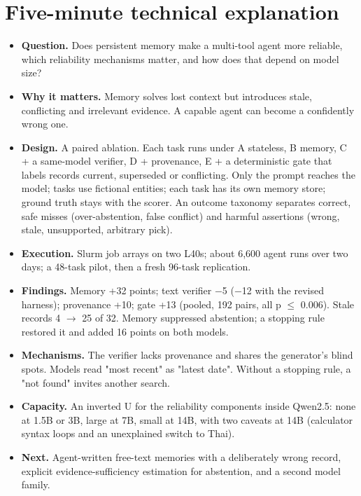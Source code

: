 \documentclass[10.5pt,a4paper,oneside]{report}
\begin{document}
\section{Five-minute technical explanation}
\begin{itemize}
\item \textbf{Question.} Does persistent memory make a multi-tool agent more reliable, which reliability mechanisms matter, and how does that depend on model size?
\item \textbf{Why it matters.} Memory solves lost context but introduces stale, conflicting and irrelevant evidence. A capable agent can become a confidently wrong one.
\item \textbf{Design.} A paired ablation. Each task runs under A stateless, B memory, C + a same-model verifier, D + provenance, E + a deterministic gate that labels records current, superseded or conflicting. Only the prompt reaches the model; tasks use fictional entities; each task has its own memory store; ground truth stays with the scorer. An outcome taxonomy separates correct, safe misses (over-abstention, false conflict) and harmful assertions (wrong, stale, unsupported, arbitrary pick).
\item \textbf{Execution.} Slurm job arrays on two L40s; about 6,600 agent runs over two days; a 48-task pilot, then a fresh 96-task replication.
\item \textbf{Findings.} Memory +32 points; text verifier −5 (−12 with the revised harness); provenance +10; gate +13 (pooled, 192 pairs, all p $\leq$ 0.006). Stale records 4 $\rightarrow$ 25 of 32. Memory suppressed abstention; a stopping rule restored it and added 16 points on both models.
\item \textbf{Mechanisms.} The verifier lacks provenance and shares the generator's blind spots. Models read "most recent" as "latest date". Without a stopping rule, a "not found" invites another search.
\item \textbf{Capacity.} An inverted U for the reliability components inside Qwen2.5: none at 1.5B or 3B, large at 7B, small at 14B, with two caveats at 14B (calculator syntax loops and an unexplained switch to Thai).
\item \textbf{Next.} Agent-written free-text memories with a deliberately wrong record, explicit evidence-sufficiency estimation for abstention, and a second model family.
\end{itemize}
\end{document}
